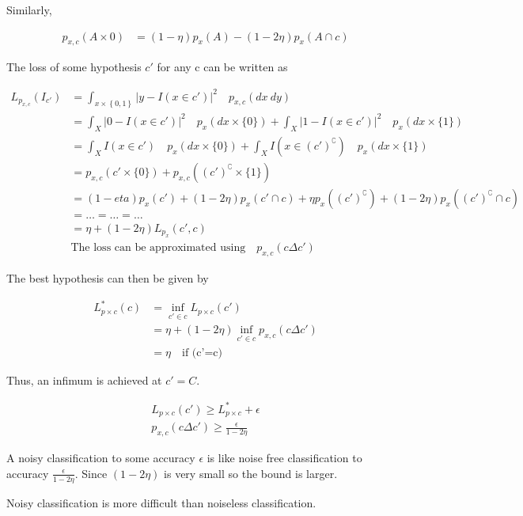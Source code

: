 \documentclass[10pt]{article}
\begin{document}
Similarly,

\begin{align*}
    p_{x,c}(A \times {0}) &= (1-\eta) p_x(A) - (1-2\eta) p_x(A \cap c)
\end{align*}

The loss of some hypothesis $c'$ for any c can be written as 

\begin{align*}
    L_{p_{x,c}}(I_{c'}) &= \int_{x \times \left\{0,1\right\} } \lvert y-I(x \in c') \rvert^2 \quad p_{x,c}(dx\ dy)\\
    &= \int_X \lvert 0-I(x \in c') \rvert^2 \quad p_x(dx \times \{0\}) +
    \int_X \lvert 1-I(x \in c') \rvert^2 \quad p_x(dx \times \{1\})\\
    &= \int_X I(x \in c')  \quad p_x(dx \times \{0\}) +
    \int_X I(x \in (c')^\complement)  \quad p_x(dx \times \{1\})\\
    &= p_{x,c}(c' \times \{0\}) + p_{x,c}( (c')^\complement \times \{1\})\\
    &= (1-eta) p_x(c') + (1-2\eta)p_x(c' \cap c) + \eta p_x((c')^\complement) + (1-2\eta)p_x((c')^\complement \cap c)\\
    &= \ldots = \ldots = \ldots \\
    &= \eta + (1-2\eta) L_{p_x}(c',c)\\
    &\text{The loss can be approximated using}\quad p_{x,c}(c \Delta c')
\end{align*}

The best hypothesis can then be given by

\begin{align*}
    L_{p\times c}^*(c) &= \inf\limits_{c' \in c} L_{p\times c}(c')\\
    &= \eta + (1-2\eta) \inf\limits_{c' \in c} p_{x,c}(c \Delta c')\\
    &= \eta \quad \text{if (c'=c)}
\end{align*}

Thus, an infimum is achieved at $c'=C$.

\begin{align*}
    L_{p\times c}(c') \geq L_{p\times c}^* + \epsilon\\
    p_{x,c}(c \Delta c') \geq \frac{\epsilon}{1-2\eta}
\end{align*}

A noisy classification to some accuracy $\epsilon$ is like noise free classification to accuracy $\frac{\epsilon}{1-2\eta}$. Since $(1-2\eta)$ is very small so the bound is larger. 

Noisy classification is more difficult than noiseless classification.



\end{document}
